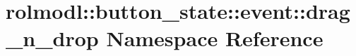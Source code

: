 \hypertarget{namespacerolmodl_1_1button__state_1_1event_1_1drag__n__drop}{}\section{rolmodl\+::button\+\_\+state\+::event\+::drag\+\_\+n\+\_\+drop Namespace Reference}
\label{namespacerolmodl_1_1button__state_1_1event_1_1drag__n__drop}
